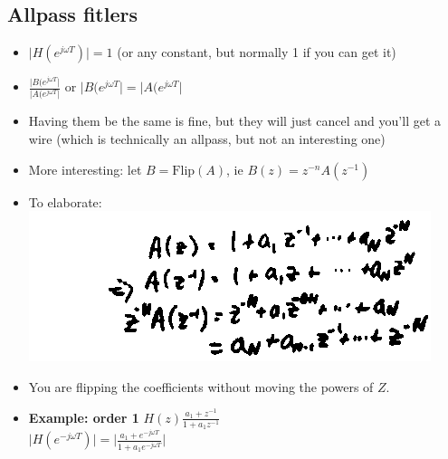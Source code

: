\subsection*{Allpass fitlers}
\begin{itemize}
\item{
$\vert H(e^{j\omega T}) \vert = 1$ (or any constant, but normally 1 if you can 
get it)
}
\item{
$
\frac{\vert B(e^{j\omega T} \vert}
{\vert A(e^{j\omega T} \vert}
$ or 
$\vert B(e^{j\omega T} \vert =
\vert A(e^{j\omega T} \vert$
}
\item{
Having them be the same is fine, but they will just cancel and you'll get 
a wire (which is technically an allpass, but not an interesting one)
}
\item{
More interesting: let $B = \mbox{Flip}(A)$, ie
$B(z) = z^{-n}A(z^{-1})$
}
\item{ 
To elaborate:
    \includegraphics[scale=0.4]{frames/23c}
}
\item{
You are flipping the coefficients without moving the powers of $Z$.
}
\item{
\textbf{Example: order 1}
$H(z) \frac{a_1 + z^{-1}}{1 + a_1 z^{-1}}$\\
$\vert H(e^{-j\omega T}) \vert =
\vert \frac{a_1 + e^{-j \omega T}}{1 + a_1 e^{-j\omega T}}\vert$\\

}
\end{itemize}
